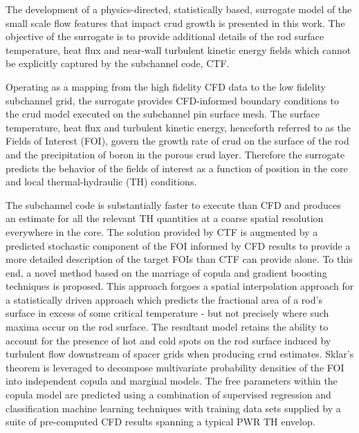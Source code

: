 
\utabstract
{}%
\indent
The development of a physics-directed, statistically based,
surrogate model of the small scale flow features that impact crud growth is presented in this work. 
The objective of the surrogate is to provide additional details of the rod surface temperature, heat
flux and near-wall turbulent kinetic energy fields which cannot be explicitly captured by the subchannel code, CTF. 

Operating as a mapping from the high fidelity CFD data to the low fidelity subchannel grid, the surrogate provides CFD-informed boundary conditions to the crud model executed on the subchannel pin surface mesh. The surface temperature, heat
flux and turbulent kinetic energy, henceforth referred to as the Fields of Interest (FOI),
govern the growth rate of crud on the surface of the rod and the
precipitation of boron in the porous crud layer. Therefore the surrogate predicts the behavior of the
fields of interest as a function of position in the core and local thermal-hydraulic (TH) conditions.

The subchannel code is substantially faster to execute than CFD
and produces an estimate for all the relevant TH quantities at a coarse spatial resolution everywhere in
the core.  The solution provided by CTF is augmented by a predicted stochastic
component of the FOI informed by CFD results to provide a more detailed description of the target
FOIs than CTF can provide alone.  To this end, a novel method based on the marriage of copula and
gradient boosting techniques is proposed. This approach forgoes a spatial interpolation approach
for a statistically driven approach which predicts the fractional area of a rod’s surface in excess of some
critical temperature - but not precisely where such maxima occur on the rod surface.
The resultant model retains the ability to account for the presence
of hot and cold spots on the rod surface induced by turbulent flow downstream of spacer grids when
producing crud estimates. Sklar’s theorem is leveraged to decompose multivariate probability densities
of the FOI into independent copula and marginal models. The free parameters within the copula model
are predicted using a combination of supervised regression and classification machine learning techniques
with training data sets supplied by a suite of pre-computed CFD results spanning a typical PWR TH
envelop.